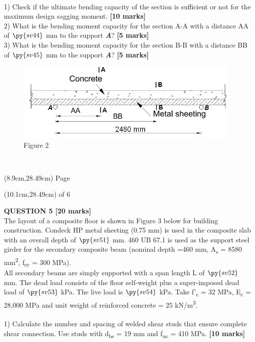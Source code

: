 \documentclass[a4paper,11pt]{article}
\begin{document}
\\
1) Check if the ultimate bending capacity of the section is sufficient or not for the maximum design sagging moment. \textbf{[10 marks]}\\
2) What is the bending moment capacity for the section A-A with a distance AA of $\py{sv44}$ mm to the support \textbf{\emph{A}}? \textbf{[5 marks]}\\
3) What is the bending moment capacity for the section B-B with a distance BB of $\py{sv45}$ mm to the support \textbf{\emph{A}}? \textbf{[5 marks]}\\
\begin{figure}[ht]
\includegraphics[width=11.08cm, height=3.86cm]{Figure2.png}\\
\centering
Figure 2\\
\centering
\end{figure}
\\
\begin{textblock*}{5cm}(8.9cm,28.49cm)
Page
\end{textblock*}
\begin{textblock*}{5cm}(10.1cm,28.49cm)
of 6
\end{textblock*}
\newpage
\noindent
\textbf{QUESTION 5 [20 marks]}\\
The layout of a composite floor is shown in Figure 3 below for building construction. Condeck HP metal sheeting (0.75 mm) is used in the composite slab with an overall depth of $\py{sv51}$ mm. 460 UB 67.1 is used as the support steel girder for the secondary composite beam (nominal depth =460 mm, A\textsubscript{s} = 8580 mm\textsuperscript{2}, f\textsubscript{sy} = 300 MPa).\\
All secondary beams are simply supported with a span length L of $\py{sv52}$ mm. The dead load consists of the floor self-weight plus a super-imposed dead load of $\py{sv53}$ kPa. The live load is $\py{sv54}$ kPa. Take f'\textsubscript{c} = 32 MPa, E\textsubscript{c} = 28,000 MPa and unit weight of reinforced concrete = 25 kN/m\textsuperscript{3}.\\
\\
1) Calculate the number and spacing of welded shear studs that ensure complete shear connection. Use studs with d\textsubscript{bs} = 19 mm and f\textsubscript{uc} = 410 MPa. \textbf{[10 marks]}\\
\end{document}
